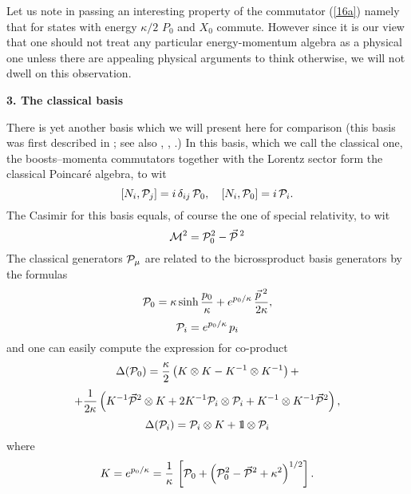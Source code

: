 \documentclass [prd,twocolumn,nofootinbib,showpacs]  {revtex4}
\def\bbbone{{\mathchoice {\rm 1\mskip-4mu l} {\rm 1\mskip-4mu l}
{\rm 1\mskip-4.5mu l} {\rm 1\mskip-5mu l}}}
\begin{document}
Let us note in passing an interesting property of the commutator
(\ref{16a}) namely  that for states with energy $\kappa/2$ $P_0$
and $X_0$ commute. However since it is our view that one should
not treat any particular energy-momentum algebra as a physical one
unless there are appealing physical arguments to think otherwise,
we will not dwell on this observation.
\newline

\noindent
\textbf{ 3. The classical basis}
\newline

There is yet another basis which we will present here for
comparison (this basis was first described in \cite{maslanka}; see also
\cite{kolumaso}, \cite{lukclas}, \cite{luruza}.) In this basis,
which we call the classical one, the boosts--momenta commutators
together with the Lorentz sector form the classical Poincar\'e
algebra, to wit
\begin{equation}\label{17}
   \left[N_{i}, {\cal P}_{j}\right] = i\, \delta_{ij}\, {\cal P}_0  ,\quad \left[N_{i}, {\cal P}_{0}\right] = i\,
   {\cal P}_i.
\end{equation}
The Casimir for this basis equals, of course the one of special relativity, to wit
\begin{equation}\label{17a}
 {\cal M}^2 = {\cal P}_0^2 - \vec{\cal P}\,{}^2
\end{equation}
The classical generators ${\cal P}_\mu$ are related to the bicrossproduct basis generators by the formulas
\begin{equation}\label{18}
 {\cal P}_{0} = \kappa \sinh\frac{p_0}\kappa + e^{p_0/\kappa}\, \frac{\vec{p}\, {}^2}{2\kappa},
\end{equation}
\begin{equation}\label{19}
 {\cal P}_{i}= e^{p_0/\kappa} \, p_i
\end{equation}
and one can easily compute the expression for co-product
$$
  \Delta({\cal P}_{0}) = \frac\kappa2\left(K \otimes K - K^{-1}\otimes K^{-1}\right)+$$
  \begin{equation}\label{20}
  + \frac1{2\kappa}\left(K^{-1} \vec{{\cal P}}{}^2 \otimes K +
  2K^{-1} {\cal P}_i \otimes {\cal P}_i + K^{-1}\otimes K^{-1}\vec{{\cal P}}{}^2\right),
\end{equation}
\begin{equation}\label{20a}
 \Delta({\cal P}_{i}) ={\cal P}_{i}\otimes K + \bbbone\otimes {\cal P}_{i}
\end{equation}
where
$$
K = e^{p_0/\kappa} = \frac1\kappa\, \left[ {\cal P}_{0} + \left(
{\cal P}_{0}^2 - \vec{{\cal P}}{}^2  +
\kappa^2\right)^{1/2}\right].
$$
\end{document}
